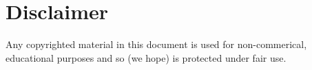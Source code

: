 \documentclass[../main/main.tex]{subfiles}
\begin{document}
\section*{Disclaimer}

Any copyrighted material in this document is used 
for non-commerical, educational purposes and so (we hope)
is protected under fair use.
\end{document}

